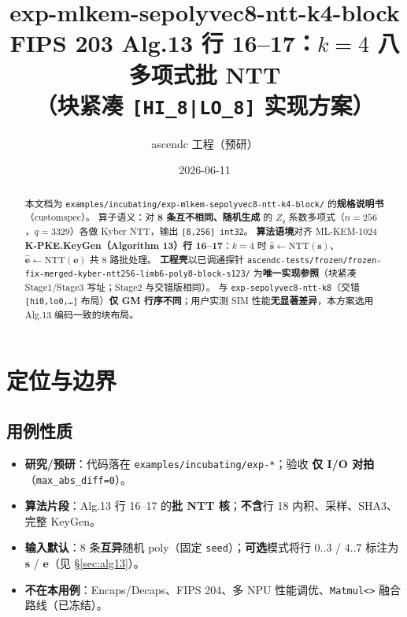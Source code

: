 \documentclass[UTF8,a4paper,11pt]{ctexart}
\title{exp-mlkem-sepolyvec8-ntt-k4-block\\FIPS 203 Alg.13 行 16–17：$k{=}4$ 八多项式批 NTT\\（块紧凑 \texttt{[HI\_8|LO\_8]} 实现方案）}
\author{ascendc 工程（预研）}
\date{2026-06-11}
\begin{document}
\maketitle

\begin{abstract}
本文档为 \texttt{examples/incubating/exp-mlkem-sepolyvec8-ntt-k4-block/} 的\textbf{规格说明书}（customspec）。
算子语义：对 \textbf{8 条互不相同、随机生成} 的 $Z_q$ 系数多项式（$n{=}256$，$q{=}3329$）各做 Kyber NTT，输出 \texttt{[8,256] int32}。
\textbf{算法语境}对齐 ML-KEM-1024 \textbf{K-PKE.KeyGen（Algorithm 13）行 16–17}：$k{=}4$ 时 $\hat{\mathbf{s}}\leftarrow\mathrm{NTT}(\mathbf{s})$、$\hat{\mathbf{e}}\leftarrow\mathrm{NTT}(\mathbf{e})$ 共 8 路批处理。
\textbf{工程壳}以已调通探针
\texttt{ascendc-tests/frozen/frozen-fix-merged-kyber-ntt256-limb6-poly8-block-s123/} 为\textbf{唯一实现参照}（块紧凑 Stage1/Stage3 写址；Stage2 与交错版相同）。
与 \texttt{exp-sepolyvec8-ntt-k8}（交错 \texttt{[hi0,lo0,\ldots]} 布局）\textbf{仅 GM 行序不同}；用户实测 SIM 性能\textbf{无显著差异}，本方案选用 Alg.13 编码一致的块布局。
\end{abstract}

\tableofcontents
\newpage

\section{定位与边界}

\subsection{用例性质}
\begin{itemize}
  \item \textbf{研究/预研}：代码落在 \texttt{examples/incubating/exp-*}；验收 \textbf{仅 I/O 对拍}（\texttt{max\_abs\_diff=0}）。
  \item \textbf{算法片段}：Alg.13 行 16–17 的\textbf{批 NTT 核}；\textbf{不含}行 18 内积、采样、SHA3、完整 KeyGen。
  \item \textbf{输入默认}：8 条\textbf{互异}随机 poly（固定 \texttt{seed}）；\textbf{可选}模式将行 $0..3$ / $4..7$ 标注为 $\mathbf{s}$ / $\mathbf{e}$（见 §\ref{sec:alg13}）。
  \item \textbf{不在本用例}：Encaps/Decaps、FIPS 204、多 NPU 性能调优、\texttt{Matmul<>} 融合路线（已冻结）。
\end{itemize}
\end{document}
